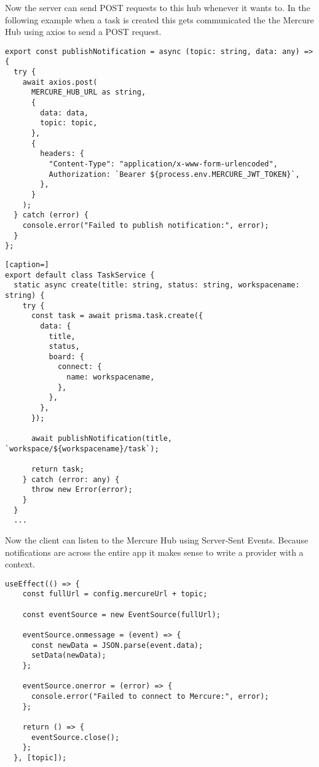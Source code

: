 Now the server can send POST requests to this hub whenever it wants to. In the following example when a task is created this gets communicated the the Mercure Hub using axios to send a POST request.

\begin{lstlisting}[caption=POST request to the Mercure Hub]
export const publishNotification = async (topic: string, data: any) => {
  try {
    await axios.post(
      MERCURE_HUB_URL as string,
      {
        data: data,
        topic: topic,
      },
      {
        headers: {
          "Content-Type": "application/x-www-form-urlencoded",
          Authorization: `Bearer ${process.env.MERCURE_JWT_TOKEN}`,
        },
      }
    );
  } catch (error) {
    console.error("Failed to publish notification:", error);
  }
};
\end{lstlisting}

\begin{lstlisting}[caption=]
export default class TaskService {
  static async create(title: string, status: string, workspacename: string) {
    try {
      const task = await prisma.task.create({
        data: {
          title,
          status,
          board: {
            connect: {
              name: workspacename,
            },
          },
        },
      });

      await publishNotification(title, `workspace/${workspacename}/task`);

      return task;
    } catch (error: any) {
      throw new Error(error);
    }
  }
  ...
\end{lstlisting}

Now the client can listen to the Mercure Hub using Server-Sent Events. Because notifications are across the entire app it makes sense to write a provider with a context.

\begin{lstlisting}[caption=EventSource listening to the topic]
  useEffect(() => {
    const fullUrl = config.mercureUrl + topic;

    const eventSource = new EventSource(fullUrl);

    eventSource.onmessage = (event) => {
      const newData = JSON.parse(event.data);
      setData(newData);
    };

    eventSource.onerror = (error) => {
      console.error("Failed to connect to Mercure:", error);
    };

    return () => {
      eventSource.close();
    };
  }, [topic]);
\end{lstlisting}

